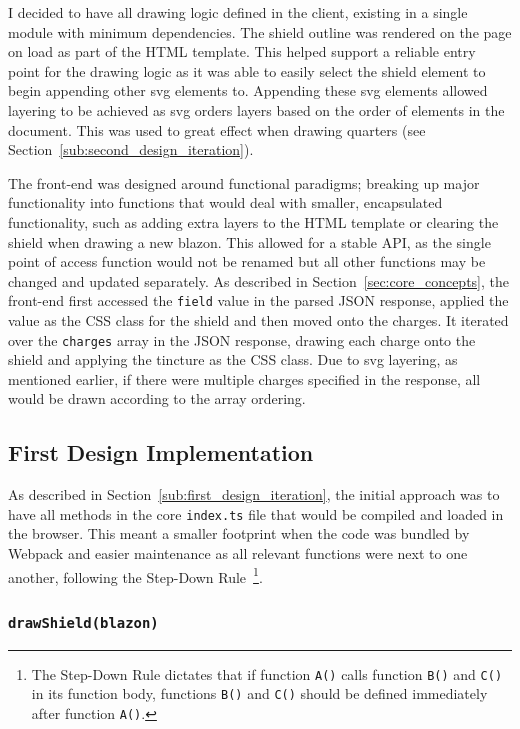\documentclass[nobib, a4paper, twoside, justified]{tufte-book}
\makeatletter
\newcommand{\svg}{\gls{svg}\@\xspace}
\newcommand{\charge}{\gls{charge}\@\xspace}
\newcommand{\charges}{\glspl{charge}\@\xspace}
\newcommand{\blazon}{\gls{blazon}\@\xspace}
\makeatother
\begin{document}
I decided to have all drawing logic defined in the client, existing in a single module with minimum
dependencies. The shield outline was rendered on the page on load as part of the HTML template.
This helped support a reliable entry point for the drawing logic as it was able to easily select
the shield element to begin appending other \svg elements to. Appending these \svg elements
allowed layering to be achieved as \svg orders layers based on the order of elements in the
document. This was used to great effect when drawing quarters (see
Section~\ref{sub:second_design_iteration}).

The front-end was designed around functional paradigms; breaking up major functionality into
functions that would deal with smaller, encapsulated functionality, such as adding extra layers to
the HTML template or clearing the shield when drawing a new \blazon. This allowed for a stable API,
as the single point of access function would not be renamed but all other functions may be changed
and updated separately. As described in Section~\ref{sec:core_concepts}, the front-end first
accessed the \texttt{field} value in the parsed JSON response, applied the value as the CSS class
for the shield and then moved onto the \charges. It iterated over the \texttt{\charges} array in
the JSON response, drawing each \charge onto the shield and applying the tincture as the CSS class.
Due to \svg layering, as mentioned earlier, if there were multiple \charges specified in the
response, all would be drawn according to the array ordering.

\subsection{First Design Implementation}%
\label{sub:first_design_implementation}

As described in Section~\ref{sub:first_design_iteration}, the initial approach was to have all methods in
the core \texttt{index.ts} file that would be compiled and loaded in the browser. This
meant a smaller footprint when the code was bundled by Webpack and easier maintenance as all
relevant functions were next to one another, following the Step-Down
Rule~\autocite{martin2009clean}\footnote{The Step-Down Rule dictates that if function \texttt{A()}
calls function \texttt{B()} and \texttt{C()} in its function body, functions \texttt{B()} and
\texttt{C()} should be defined immediately after function \texttt{A()}.}.

\subsubsection{\texttt{drawShield(\blazon)}}%
\label{ssub:draw_shield}
\end{document}
